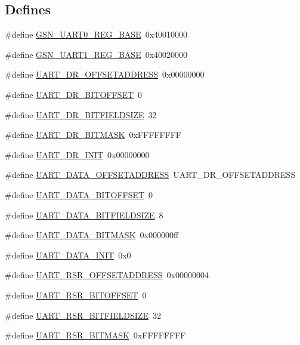 \subsection*{Defines}
\begin{DoxyCompactItemize}
\item 
\#define \hyperlink{a00575_ad2a4666b8d4948fa11e988fccf0d88f7}{GSN\_\-UART0\_\-REG\_\-BASE}~0x40010000
\item 
\#define \hyperlink{a00575_a561c2e1172058dd7aa531ae977dec5fd}{GSN\_\-UART1\_\-REG\_\-BASE}~0x40020000
\item 
\#define \hyperlink{a00575_ac55f4c04a3f35d078d2f955aa90de227}{UART\_\-DR\_\-OFFSETADDRESS}~0x00000000
\item 
\#define \hyperlink{a00575_a542a3531f073c82e62f45c6f318e66df}{UART\_\-DR\_\-BITOFFSET}~0
\item 
\#define \hyperlink{a00575_a8d2f0d08577a7ca69ff79c1e642c809a}{UART\_\-DR\_\-BITFIELDSIZE}~32
\item 
\#define \hyperlink{a00575_afdaa6122fd651437ffa1f254be49fc29}{UART\_\-DR\_\-BITMASK}~0xFFFFFFFF
\item 
\#define \hyperlink{a00575_a99b3674088a38772dc77add311d134d1}{UART\_\-DR\_\-INIT}~0x00000000
\item 
\#define \hyperlink{a00575_a0b89ab17c85fe138063876efa33565c2}{UART\_\-DATA\_\-OFFSETADDRESS}~UART\_\-DR\_\-OFFSETADDRESS
\item 
\#define \hyperlink{a00575_a059b89ab1631fee4ae2bc20cfec83402}{UART\_\-DATA\_\-BITOFFSET}~0
\item 
\#define \hyperlink{a00575_a518e330590e2db2a261952e0dc2b00e6}{UART\_\-DATA\_\-BITFIELDSIZE}~8
\item 
\#define \hyperlink{a00575_a0096631c3ca5c4026998e2055a1260e5}{UART\_\-DATA\_\-BITMASK}~0x000000ff
\item 
\#define \hyperlink{a00575_a4b3fca5fdbe8bc1d69e2e1dbde549e19}{UART\_\-DATA\_\-INIT}~0x0
\item 
\#define \hyperlink{a00575_ae0c367125bc1c9e53aee01b206728f90}{UART\_\-RSR\_\-OFFSETADDRESS}~0x00000004
\item 
\#define \hyperlink{a00575_a5fc882f3464f0f83b83b0d7c2a135f39}{UART\_\-RSR\_\-BITOFFSET}~0
\item 
\#define \hyperlink{a00575_a456ae18a3f4e54606a1c773942e00cb6}{UART\_\-RSR\_\-BITFIELDSIZE}~32
\item 
\#define \hyperlink{a00575_afb215d0e887ea40d821f59828ed8511b}{UART\_\-RSR\_\-BITMASK}~0xFFFFFFFF
\item 

\end{DoxyCompactItemize}

